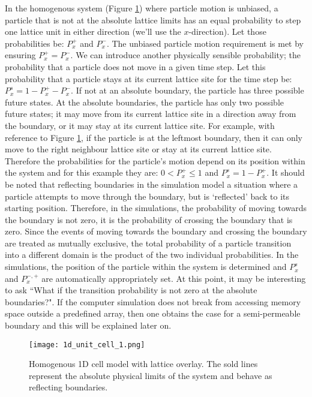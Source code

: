 	In the homogenous system (Figure \ref{fig:1d_unit_cell_1.png}) where particle motion is unbiased, a particle that is not at the absolute lattice limits has an equal probability to step one lattice unit in either direction (we'll use the $ x $-direction). Let those probabilities be: $ P_x^+ $ and $ P_x^- $. The unbiased particle motion requirement is met by ensuring $ P_x^+ = P_x^- $. We can introduce another physically sensible probability; the probability that a particle does not move in a given time step. Let this probability that a particle stays at its current lattice site for the time step be: $ P_x^s = 1 - P_x^+ - P_x^- $. If not at an absolute boundary, the particle has three possible future states. At the absolute boundaries, the particle has only two possible future states; it may move from its current lattice site in a direction away from the boundary, or it may stay at its current lattice site. For example, with reference to Figure \ref{fig:1d_unit_cell_1.png}, if the particle is at the leftmost boundary, then it can only move to the right neighbour lattice site or stay at its current lattice site. Therefore the probabilities for the particle's motion depend on its position within the system and for this example they are: $ 0 < P_x^+ \leq 1 $ and $ P_x^s = 1 - P_x^+ $. It should be noted that reflecting boundaries in the simulation model a situation where a particle attempts to move through the boundary, but is `reflected' back to its starting position. Therefore, in the simulations, the probability of moving towards the boundary is not zero, it is the probability of crossing the boundary that is zero. Since the events of moving towards the boundary and crossing the boundary are treated as mutually exclusive, the total probability of a particle transition into a different domain is the product of the two individual probabilities. In the simulations, the position of the particle within the system is determined and $ P_x^s $ and $ P_x^{-,+} $ are automatically appropriately set. At this point, it may be interesting to ask ``What if the transition probability is not zero at the absolute boundaries?". If the computer simulation does not break from accessing memory space outside a predefined array, then one obtains the case for a semi-permeable boundary and this will be explained later on.
	
	\begin{figure}[h]
		\centering
		\texttt{[image: 1d\_unit\_cell\_1.png]}
		\caption{Homogenous 1D cell model with lattice overlay. The sold lines represent the absolute physical limits of the system and behave as reflecting boundaries.}
		\label{fig:1d_unit_cell_1.png}
		\end{figure}	
	
